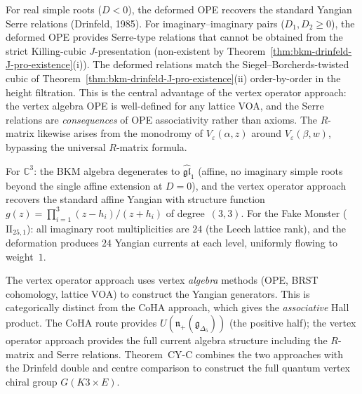 \begin{remark}
\label{rem:bypass-drinfeld}
For real simple roots ($D < 0$), the deformed OPE recovers the standard Yangian Serre relations (Drinfeld, 1985). For imaginary--imaginary pairs ($D_1, D_2 \geq 0$), the deformed OPE provides Serre-type relations that cannot be obtained from the strict Killing-cubic $J$-presentation (non-existent by Theorem~\ref{thm:bkm-drinfeld-J-pro-existence}(i)). The deformed relations match the Siegel--Borcherds-twisted cubic of Theorem~\ref{thm:bkm-drinfeld-J-pro-existence}(ii) order-by-order in the height filtration. This is the central advantage of the vertex operator approach: the vertex algebra OPE is well-defined for any lattice VOA, and the Serre relations are \emph{consequences} of OPE associativity rather than axioms. The $R$-matrix likewise arises from the monodromy of $V_\varepsilon(\alpha, z)$ around $V_\varepsilon(\beta, w)$, bypassing the universal $R$-matrix formula.
\end{remark}

\begin{remark}
\label{rem:borcherds-vertex-consistency}
For $\mathbb{C}^3$: the BKM algebra degenerates to $\widehat{\mathfrak{gl}}_1$ (affine, no imaginary simple roots beyond the single affine extension at $D = 0$), and the vertex operator approach recovers the standard affine Yangian with structure function $g(z) = \prod_{i=1}^3 (z - h_i)/(z + h_i)$ of degree~$(3,3)$. For the Fake Monster ($\mathrm{II}_{25,1}$): all imaginary root multiplicities are $24$ (the Leech lattice rank), and the deformation produces $24$ Yangian currents at each level, uniformly flowing to weight~$1$.
\end{remark}

\begin{remark}[vertex algebra methods \texorpdfstring{$\neq$}{!=} CoHA]
\label{rem:vertex-not-coha}
The vertex operator approach uses vertex \emph{algebra} methods (OPE, BRST cohomology, lattice VOA) to construct the Yangian generators. This is categorically distinct from the CoHA approach, which gives the \emph{associative} Hall product. The CoHA route provides $U(\mathfrak{n}_+(\mathfrak{g}_{\Delta_5}))$ (the positive half); the vertex operator approach provides the full current algebra structure including the $R$-matrix and Serre relations. Theorem~CY-C combines the two approaches with the Drinfeld double and centre comparison to construct the full quantum vertex chiral group $G(K3 \times E)$.
\end{remark}

